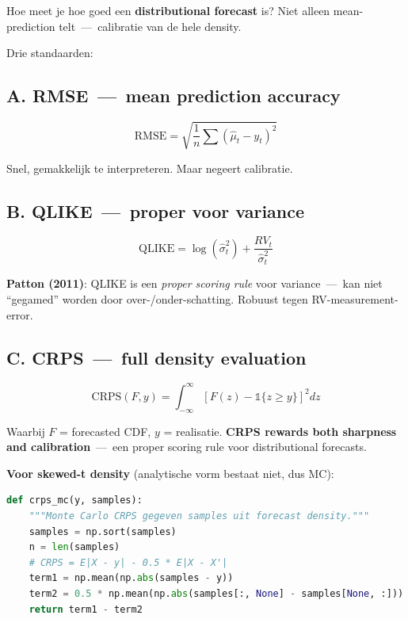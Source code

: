 \documentclass[11pt,a4paper]{article}
\begin{document}
Hoe meet je hoe goed een \textbf{distributional forecast} is? Niet alleen mean-prediction telt \,---\, calibratie van de hele density.

Drie standaarden:

\hypertarget{a.-rmse-mean-prediction-accuracy}{%
\subsection{A. RMSE \,---\, mean prediction accuracy}\label{a.-rmse-mean-prediction-accuracy}}

\[\text{RMSE} = \sqrt{\frac{1}{n}\sum (\hat\mu_t - y_t)^2}\]

Snel, gemakkelijk te interpreteren. Maar negeert calibratie.

\hypertarget{b.-qlike-proper-voor-variance}{%
\subsection{B. QLIKE \,---\, proper voor variance}\label{b.-qlike-proper-voor-variance}}

\[\text{QLIKE} = \log(\hat\sigma_t^2) + \frac{RV_t}{\hat\sigma_t^2}\]

\textbf{Patton (2011)}: QLIKE is een \emph{proper scoring rule} voor variance \,---\, kan niet ``gegamed'' worden door over-/onder-schatting. Robuust tegen RV-measurement-error.

\hypertarget{c.-crps-full-density-evaluation}{%
\subsection{C. CRPS \,---\, full density evaluation}\label{c.-crps-full-density-evaluation}}

\[\text{CRPS}(F, y) = \int_{-\infty}^{\infty} \left[F(z) - \mathbb{1}\{z \geq y\}\right]^2 dz\]

Waarbij \(F\) = forecasted CDF, \(y\) = realisatie. \textbf{CRPS rewards both sharpness and calibration} \,---\, een proper scoring rule voor distributional forecasts.

\textbf{Voor skewed-t density} (analytische vorm bestaat niet, dus MC):

\begin{lstlisting}[language=Python]
def crps_mc(y, samples):
    """Monte Carlo CRPS gegeven samples uit forecast density."""
    samples = np.sort(samples)
    n = len(samples)
    # CRPS = E|X - y| - 0.5 * E|X - X'|
    term1 = np.mean(np.abs(samples - y))
    term2 = 0.5 * np.mean(np.abs(samples[:, None] - samples[None, :]))
    return term1 - term2
\end{lstlisting}
\end{document}
